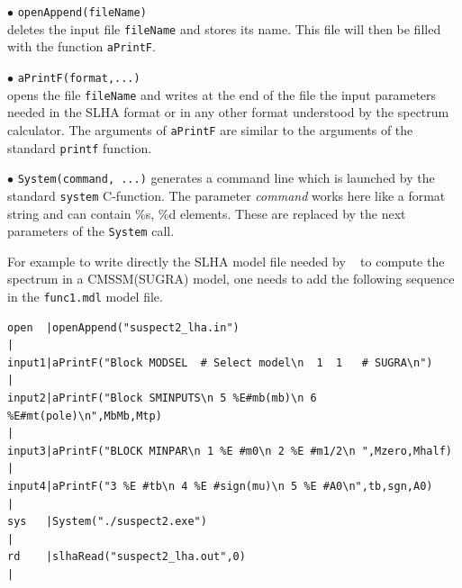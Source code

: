 \documentclass[12pt,a4paper]{article}
\begin{document}
{\noindent
$\bullet$ \verb|openAppend(fileName)|\\
deletes the input file \verb|fileName| and stores its name. This file will then be filled with
the function \verb|aPrintF|.

\noindent
$\bullet$ \verb|aPrintF(format,...)|\\
opens the file \verb|fileName| and writes at the end of the file the input parameters needed in the SLHA format or in any other format
understood by the spectrum calculator.  The arguments of 
\verb|aPrintF| are similar to the arguments of the standard \verb|printf| function.

\noindent
$\bullet$ \verb|System(command, ...)|  
generates a command line which is launched by the standard \verb|system|
C-function. The parameter {\it command} works here like a format string and can contain \%s, \%d elements. 
These are replaced by the next parameters  of the \verb|System|  call.

For example to write directly the SLHA model file needed by \suspect~ to compute 
the spectrum in a CMSSM(SUGRA) model, one needs to add the following sequence in the \verb|func1.mdl| model file.

\begin{verbatim}
open  |openAppend("suspect2_lha.in")                                                                                                                                                                                                                             |
input1|aPrintF("Block MODSEL  # Select model\n  1  1   # SUGRA\n")                                                                                                                                                                              |
input2|aPrintF("Block SMINPUTS\n 5 %E#mb(mb)\n 6 %E#mt(pole)\n",MbMb,Mtp)                                                                                                                                                               |
input3|aPrintF("BLOCK MINPAR\n 1 %E #m0\n 2 %E #m1/2\n ",Mzero,Mhalf)                                                                                                                                          |
input4|aPrintF("3 %E #tb\n 4 %E #sign(mu)\n 5 %E #A0\n",tb,sgn,A0)                                                                                                                                          |
sys   |System("./suspect2.exe")                                                                                                                                                                                                                                 |
rd    |slhaRead("suspect2_lha.out",0)                                                                                                                                                                                                                           |
\end{verbatim}

}
\end{document}
